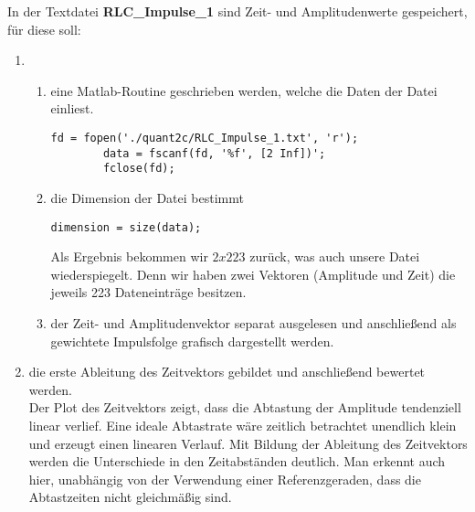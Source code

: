 In der Textdatei \textbf{RLC\_Impulse\_1} sind Zeit- und Amplitudenwerte gespeichert, für diese soll:
\begin{enumerate}[label=\alph*)]
	\lstset{language=matlab}
	\item
	\begin{enumerate}[label=\arabic*.]
		\item eine Matlab-Routine geschrieben werden, welche die Daten der Datei einliest. \vspace{-12pt}\\
		\begin{lstlisting}[style=matlab]
		fd = fopen('./quant2c/RLC_Impulse_1.txt', 'r');
		data = fscanf(fd, '%f', [2 Inf])';
		fclose(fd);
		\end{lstlisting}
		\vspace{\baselineskip}
		
		\item die Dimension der Datei bestimmt \vspace{-12pt}\\
		\begin{lstlisting}[style=matlab]
		dimension = size(data);
		\end{lstlisting}
		\vspace{-4pt}
		Als Ergebnis bekommen wir $2x223$ zurück, was auch unsere Datei wiederspiegelt. Denn wir haben zwei Vektoren (Amplitude und Zeit) die jeweils 223 Dateneinträge besitzen. \\
	
		\item der Zeit- und Amplitudenvektor separat ausgelesen und anschließend als gewichtete Impulsfolge grafisch dargestellt werden. \vspace{4pt}\\
	\end{enumerate}
	\clearpage
		
	\item die erste Ableitung des Zeitvektors gebildet und anschließend bewertet werden. \vspace{4pt}\\
	Der Plot des Zeitvektors zeigt, dass die Abtastung der Amplitude tendenziell linear verlief. Eine ideale Abtastrate wäre zeitlich betrachtet unendlich klein und erzeugt einen linearen Verlauf. Mit Bildung der Ableitung des Zeitvektors werden die Unterschiede in den Zeitabständen deutlich. Man erkennt auch hier, unabhängig von der Verwendung einer Referenzgeraden, dass die Abtastzeiten nicht gleichmäßig sind.
	\clearpage
	

\end{enumerate}
